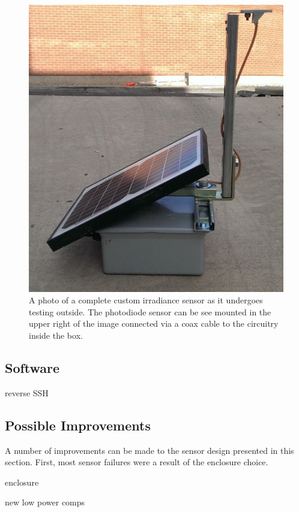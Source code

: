\begin{figure}[p]
  \includegraphics[width=\textwidth]{figs/sensor_outside.jpg}
\caption[A complete custom sensor]{A photo of a complete custom
  irradiance sensor as it undergoes testing outside. The photodiode
  sensor can be see mounted in the upper right of the image connected
  via a coax cable to the circuitry inside the box.}
\label{fig:sensor_outside}
\end{figure}

\subsection{Software}

reverse SSH

\subsection{Possible Improvements}
A number of improvements can be made to the sensor design presented in
this section.
First, most sensor failures were a result of the enclosure choice.

enclosure

new low power comps

